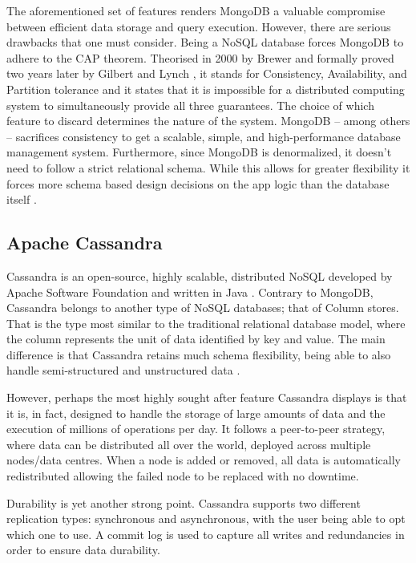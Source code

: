\documentclass[conference]{IEEEtran}
\begin{document}
The aforementioned set of features renders MongoDB a valuable compromise between efficient data storage and query execution. However, there are serious drawbacks that one must consider. Being a NoSQL database forces MongoDB to adhere to the CAP theorem. Theorised in 2000 by Brewer \cite{b13} and formally proved two years later by Gilbert and Lynch \cite{b14, b15}, it stands for Consistency, Availability, and Partition tolerance and it states that it is impossible for a distributed computing system to simultaneously provide all three guarantees. The choice of which feature to discard determines the nature of the system. MongoDB – among others – sacrifices consistency to get a scalable, simple, and high-performance database management system. Furthermore, since MongoDB is denormalized, it doesn’t need to follow a strict relational schema. While this allows for greater flexibility it forces more schema based design decisions on the app logic than the database itself \cite{b7, b12}.


\subsection{Apache Cassandra}

Cassandra is an open-source, highly scalable, distributed NoSQL developed by Apache Software Foundation and written in Java \cite{b11, b16}. Contrary to MongoDB, Cassandra belongs to another type of NoSQL databases; that of Column stores. That is the type most similar to the traditional relational database model, where the column represents the unit of data identified by key and value. The main difference is that Cassandra retains much schema flexibility, being able to also handle semi-structured and unstructured data \cite{b11}.

However, perhaps the most highly sought after feature Cassandra displays is that it is, in fact, designed to handle the storage of large amounts of data and the execution of millions of operations per day. It follows a peer-to-peer strategy, where data can be distributed all over the world, deployed across multiple nodes/data centres. When a node is added or removed, all data is automatically redistributed allowing the failed node to be replaced with no downtime.

Durability is yet another strong point. Cassandra supports two different replication types: synchronous and asynchronous, with the user being able to opt which one to use. A commit log is used to capture all writes and redundancies in order to ensure data durability.
\end{document}
